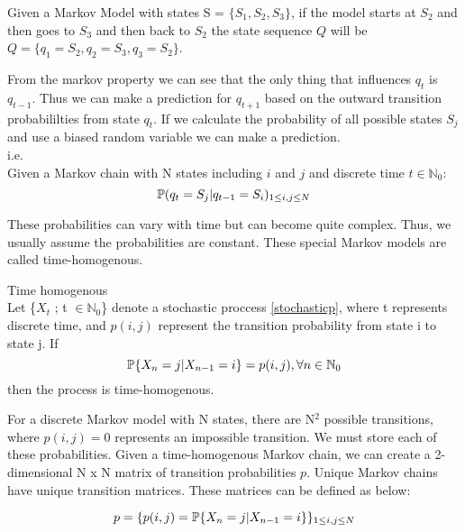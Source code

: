 \begin{example}
	\label{stateseq}
	Given a Markov Model with states S = $\{S_1,S_2,S_3\}$, if the model starts at $S_2$ and then goes to $S_3$ and then back to $S_2$ the state sequence $Q$ will be $Q = \{q_1 = S_2, q_2 = S_3, q_3 = S_2\}$.
\end{example}

From the markov property we can see that the only thing that influences $q_t$ is $q_{t-1}$. Thus we can make a prediction for $q_{t+1}$ based on the outward transition probabililties from state $q_t$. If we calculate the probability of all possible states $S_j$ and use a biased random variable we can make a prediction.
\\
i.e. 
\\
Given a Markov chain with N states including $i$ and $j$ and discrete time $t \in \mathbb{N}_0$:
\begin{equation}
	\mathbb{P} (q_t = S_j | q_{t-1} = S_i)_{1 \leq i,j \leq N}
\end{equation}


These probabilities can vary with time but can become quite complex. Thus, we usually assume the probabilities are constant. These special Markov models are called time-homogenous. 

\begin{definition}
\label{timehomogenous}
	Time homogenous \\
	Let \{$X_t$ ; t $\in \mathbb{N}_0$\} denote a stochastic proccess \ref{stochasticp}, where t represents discrete time, and $p(i,j)$ represent the transition probability from state i to state j. If 
	\begin{equation}
		\mathbb{P} \{X_n = j | X_{n-1} = i\} = p(i,j),       \forall n \in \mathbb{N}_0
	\end{equation}
	then the process is time-homogenous.
\end{definition}

For a discrete Markov model with N states, there are N$^2$ possible transitions, where $p(i,j) = 0$ represents an impossible transition. We must store each of these probabilities. Given a time-homogenous Markov chain, we can create a 2-dimensional N x N matrix of transition probabilities $p$. Unique Markov chains have unique transition matrices. These matrices can be defined as below:

\begin{equation}
	\label{pmat}
	p = \{ p(i,j) = \mathbb{P} \{ X_n = j | X_{n-1} = i \}\}_{1 \leq i,j \leq N}
\end{equation}

